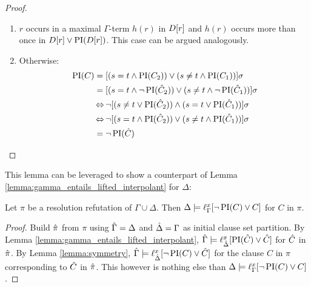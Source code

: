 \begin{proof}
\begin{itemize}
\begin{enumerate}
				\item $r$ occurs in a maximal $\Gamma$-term $h(r)$ in $D[r]$ and $h(r)$ occurs more than once in $D[r] \lor \operatorname{PI}(D[r])$.
					This case can be argued analogously.
				\item Otherwise:
					\begin{align*}
						\operatorname{PI}(C) &= [ ( s=t \land \operatorname{PI}(C_2) ) \lor (s\neq t \land \operatorname{PI}(C_1)) ]\sigma \\
									 &= [ ( s=t \land \lnot \operatorname{PI}(\hat{C}_2) ) \lor (s\neq t \land \lnot \operatorname{PI}(\hat{C}_1)) ]\sigma \\
									 &\operatorname{\Leftrightarrow} \lnot [ ( s\neq t \lor \operatorname{PI}(\hat{C}_2) ) \land (s=t \lor \operatorname{PI}(\hat{C}_1)) ]\sigma \\
									 &\operatorname{\Leftrightarrow} \lnot [ ( s=t \land \operatorname{PI}(\hat{C}_2) ) \lor (s\neq t \land \operatorname{PI}(\hat{C}_1)) ]\sigma \\
									 &= \lnot \operatorname{PI}(\hat{C})
					\qedhere
					\end{align*}
			\end{enumerate}


	\end{itemize}

\end{proof}

This lemma can be leveraged to show a counterpart of Lemma \ref{lemma:gamma_entails_lifted_interpolant} for $\Delta$:\nopagebreak

\begin{cor}
	\label{cor:delta_entails_lifted_interpolant}
	Let $\pi$ be a resolution refutation of $\Gamma \cup \Delta$. 
	Then $\Delta \models \ell_{\Gamma}^{x}[ \lnot \operatorname{PI}(C) \lor C ]$ for $C$ in $\pi$.
\end{cor}
\begin{proof}
	Build $\hat{\pi}$ from $\pi$ using $\hat{\Gamma} = \Delta$ and $\hat{\Delta} = \Gamma$ as initial clause set partition.
	\newline
	By Lemma \ref{lemma:gamma_entails_lifted_interpolant}, $\hat{\Gamma} \models \ell_{\hat{\Delta}}^{x}[ \operatorname{PI}(\hat{C}) \lor \hat{C} ]$ for $\hat{C}$ in $\hat{\pi}$.
	\newline
	By Lemma \ref{lemma:symmetry},
$\hat{\Gamma} \models \ell_{\hat{\Delta}}^{x}[ \lnot \operatorname{PI}(C) \lor \hat{C} ]$ for the clause $C$ in $\pi$ corresponding to $\hat{C}$ in $\hat{\pi}$. 
	This however is nothing else than 
$\Delta \entails\nolinebreak \lft{\Gamma}{x}{ \lnot \PI(C) \lor C }$.
\end{proof}


